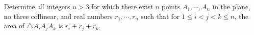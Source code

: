 Determine all integers $ n > 3$ for which there exist $ n$ points $ A_{1},\cdots ,A_{n}$ in the plane, no three collinear, and real numbers $ r_{1},\cdots ,r_{n}$ such that for $ 1\leq i < j < k\leq n$,  the area of $ \triangle A_{i}A_{j}A_{k}$ is $ r_{i} + r_{j} + r_{k}$.